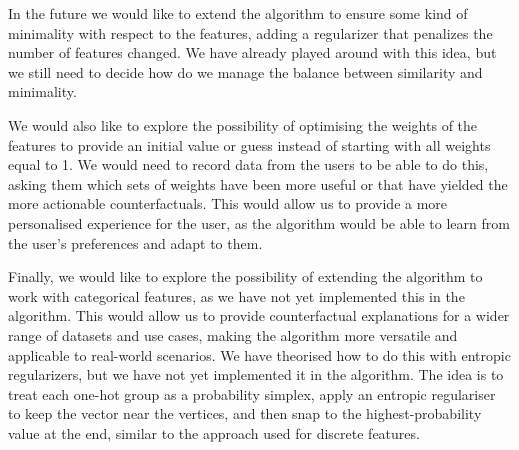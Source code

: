 \documentclass[12pt]{extarticle}
\numberwithin{equation}{section}
\begin{document}
In the future we would like to extend the algorithm to ensure some kind of minimality with respect to the features, adding a regularizer that penalizes the number of features changed. We have already played around with this idea, but we still need to decide how do we manage the balance between similarity and minimality. 

We would also like to explore the possibility of optimising the weights of the features to provide an initial value or guess instead of starting with all weights equal to 1. We would need to record data from the users to be able to do this, asking them which sets of weights have been more useful or that have yielded the more actionable counterfactuals. This would allow us to provide a more personalised experience for the user, as the algorithm would be able to learn from the user's preferences and adapt to them.

Finally, we would like to explore the possibility of extending the algorithm to work with categorical features, as we have not yet implemented this in the algorithm. This would allow us to provide counterfactual explanations for a wider range of datasets and use cases, making the algorithm more versatile and applicable to real-world scenarios. We have theorised how to do this with entropic regularizers, but we have not yet implemented it in the algorithm. The idea is to treat each one-hot group as a probability simplex, apply an entropic regulariser to keep the vector near the vertices, and then snap to the highest-probability value at the end, similar to the approach used for discrete features.
\end{document}
